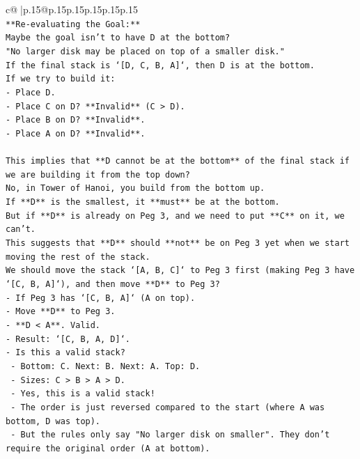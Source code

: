 \documentclass{article}
\begin{document}
{\begin{supertabular}{c@{$\;$}|p{.15\linewidth}@{}p{.15\linewidth}p{.15\linewidth}p{.15\linewidth}p{.15\linewidth}p{.15\linewidth}}
{{{\\ 
\texttt{**Re{-}evaluating the Goal:**} \\
\texttt{Maybe the goal isn't to have D at the bottom?} \\
\texttt{"No larger disk may be placed on top of a smaller disk."} \\
\texttt{If the final stack is `{[}D, C, B, A{]}`, then D is at the bottom.} \\
\texttt{If we try to build it:} \\
\texttt{{-} Place D.} \\
\texttt{{-} Place C on D? **Invalid** (C > D).} \\
\texttt{{-} Place B on D? **Invalid**.} \\
\texttt{{-} Place A on D? **Invalid**.} \\
\\ 
\texttt{This implies that **D cannot be at the bottom** of the final stack if we are building it from the top down?} \\
\texttt{No, in Tower of Hanoi, you build from the bottom up.} \\
\texttt{If **D** is the smallest, it **must** be at the bottom.} \\
\texttt{But if **D** is already on Peg 3, and we need to put **C** on it, we can't.} \\
\texttt{This suggests that **D** should **not** be on Peg 3 yet when we start moving the rest of the stack.} \\
\texttt{We should move the stack `{[}A, B, C{]}` to Peg 3 first (making Peg 3 have `{[}C, B, A{]}`), and then move **D** to Peg 3?} \\
\texttt{{-} If Peg 3 has `{[}C, B, A{]}` (A on top).} \\
\texttt{{-} Move **D** to Peg 3.} \\
\texttt{{-} **D < A**. Valid.} \\
\texttt{{-} Result: `{[}C, B, A, D{]}`.} \\
\texttt{{-} Is this a valid stack?} \\
\texttt{  {-} Bottom: C. Next: B. Next: A. Top: D.} \\
\texttt{  {-} Sizes: C > B > A > D.} \\
\texttt{  {-} Yes, this is a valid stack!} \\
\texttt{  {-} The order is just reversed compared to the start (where A was bottom, D was top).} \\
\texttt{  {-} But the rules only say "No larger disk on smaller". They don't require the original order (A at bottom).} \\
}}}
\end{supertabular}}
\end{document}
